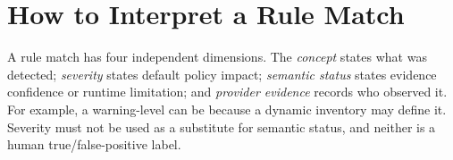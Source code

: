 \section{How to Interpret a Rule Match}
A rule match has four independent dimensions. The \emph{concept} states what
was detected; \emph{severity} states default policy impact; \emph{semantic
status} states evidence confidence or runtime limitation; and \emph{provider
evidence} records who observed it. For example, a warning-level
 can be  because a dynamic inventory
may define it. Severity must not be used as a substitute for semantic status,
and neither is a human true/false-positive label.
